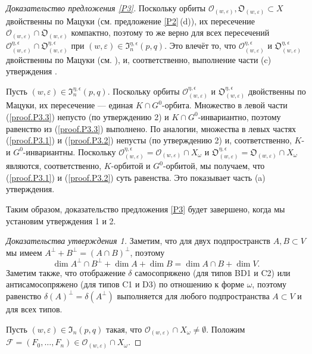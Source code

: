 \documentclass{amsart}
\theoremstyle{definition}
\begin{document}
\begin{proof}[Доказательство предложения \ref{P3}]
Поскольку орбиты $\mathcal{O}_{(w,\varepsilon)},\mathfrak{O}_{(w,\varepsilon)}\subset X$ двойственны по Мацуки (см. предложение \ref{P2}\,{\rm (d)}), их пересечение $\mathcal{O}_{(w,\varepsilon)}\cap\mathfrak{O}_{(w,\varepsilon)}$ компактно, поэтому то же верно для всех пересечений $\mathcal{O}_{(w,\varepsilon)}^{\eta,\epsilon}\cap
\mathfrak{O}_{(w,\varepsilon)}^{\eta,\epsilon}$ при $(w,\varepsilon)\in\mathfrak{I}_n^{\eta,\epsilon}(p,q)$.  Это влечёт то, что $\mathcal{O}_{(w,\varepsilon)}^{\eta,\epsilon}$ и $\mathfrak{O}_{(w,\varepsilon)}^{\eta,\epsilon}$ двойственны по Мацуки (см. \cite{Gindikin-Matsuki}), и, соответственно, выполнение части {\rm (c)} утверждения .

Пусть $(w,\varepsilon)\in\mathfrak{I}_n^{\eta,\epsilon}(p,q)$. Поскольку орбиты $\mathcal{O}_{(w,\varepsilon)}^{\eta,\epsilon}$ и $\mathfrak{O}_{(w,\varepsilon)}^{\eta,\epsilon}$ двойственны по Мацуки, их пересечение --- единая $K\cap G^0$-орбита. Множество в левой части  (\ref{proof.P3.3}) непусто (по утверждению 2) и $K\cap G^0$-инвариантно, поэтому равенство из (\ref{proof.P3.3}) выполнено. По аналогии, множества в левых частях  (\ref{proof.P3.1}) и (\ref{proof.P3.2}) непусты (по утверждению 2) и, соответственно, $K$- и $G^0$-инвариантны. Поскольку $\mathcal{O}_{(w,\varepsilon)}^{\eta,\epsilon}=\mathcal{O}_{(w,\varepsilon)}\cap X_\omega$ и $\mathfrak{O}_{(w,\varepsilon)}^{\eta,\epsilon}=\mathfrak{O}_{(w,\varepsilon)}\cap X_\omega$  являются, соответственно, $K$-орбитой и $G^0$-орбитой, мы получаем, что (\ref{proof.P3.1}) и (\ref{proof.P3.2}) суть равенства. Это показывает часть {\rm (a)} утверждения.

Таким образом, доказательство предложения \ref{P3} будет завершено, когда мы установим утверждения 1 и 2.

\medskip
\noindent
{\it Доказательства утверждения 1.}
Заметим, что для двух подпространств $A,B\subset V$ мы имеем
$A^\perp+B^\perp=(A\cap B)^\perp$, поэтому
\begin{equation}
\label{proof-P3.4}
\dim A^\perp\cap B^\perp+\dim A+\dim B=\dim A\cap B+\dim V.
\end{equation}
Заметим также, что отображение $\delta$
самосопряжено (для типов BD1 и C2) или антисамосопряжено (для типов C1 и D3) по отношению к форме $\omega$, поэтому равенство $\delta(A)^\perp=\delta(A^\perp)$ выполняется для любого подпространства $A\subset V$ и для всех типов.

Пусть $(w,\varepsilon)\in\mathfrak{I}_n(p,q)$ такая, что $\mathcal{O}_{(w,\varepsilon)}\cap X_\omega\not=\emptyset$.
Положим $\mathcal{F}=(F_0,\ldots,F_n)\in \mathcal{O}_{(w,\varepsilon)}\cap X_\omega$.


\end{proof}
\end{document}
